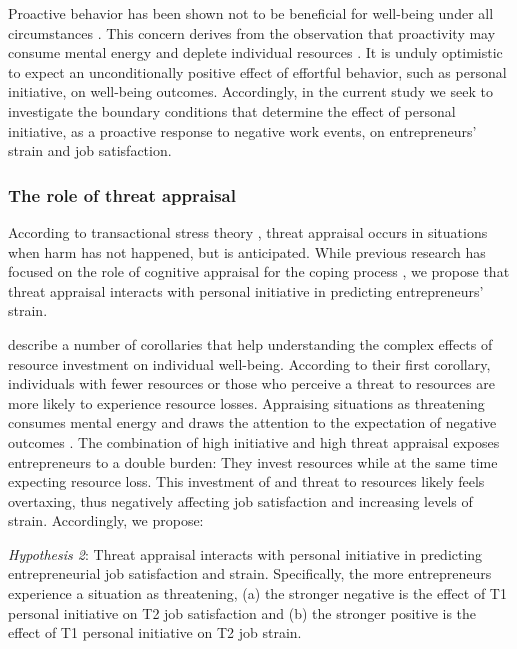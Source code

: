 \documentclass[man, 12pt, a4paper, noextraspace]{apa6}
\begin{document}
Proactive behavior has been shown not to be beneficial for well-being under all circumstances \parencite[e.g.,][]{Bolino.2010, Strauss2017, Parker2019}. 
This concern derives from the observation that proactivity may consume mental energy \parencite{Bolino.2010} and deplete individual resources \parencite{Grant.2011}.
It is unduly optimistic to expect an unconditionally positive effect of effortful behavior, such as personal initiative, on well-being outcomes.
Accordingly, in the current study we seek to investigate the boundary conditions that determine the effect of personal initiative, as a proactive response to negative work events, on entrepreneurs' strain and job satisfaction.  \par

\subsubsection{The role of threat appraisal}
According to transactional stress theory \parencite[TST, e.g.,][]{Lazarus.1966}, threat appraisal occurs in situations when harm has not happened, but is anticipated. 
While previous research has focused on the role of cognitive appraisal for the coping process \parencite[e.g.,][]{Parkes1984, Folkman.1986}, we propose that threat appraisal interacts with personal initiative in predicting entrepreneurs' strain. \par 
\textcite{Hobfoll2004, Hobfoll.2001} describe a number of corollaries that help understanding the complex effects of resource investment on individual well-being. 
According to their first corollary, individuals with fewer resources or those who perceive a threat to resources are more likely to experience resource losses.  
Appraising situations as threatening consumes mental energy and draws the attention to the expectation of negative outcomes \parencite[e.g.,]{Lazarus.1995}. 
The combination of high initiative and high threat appraisal exposes entrepreneurs to a double burden: They invest resources while at the same time expecting resource loss. 
This investment of and threat to resources likely feels overtaxing, thus negatively affecting job satisfaction and increasing levels of strain.
Accordingly, we propose: \par 

\textit{Hypothesis 2}: Threat appraisal interacts with personal initiative in predicting entrepreneurial job satisfaction and strain. Specifically, the more entrepreneurs experience a situation as threatening, (a) the stronger negative is the effect of T1 personal initiative on T2 job satisfaction and (b) the stronger positive is the effect of T1 personal initiative on T2 job strain. \par 
\end{document}
